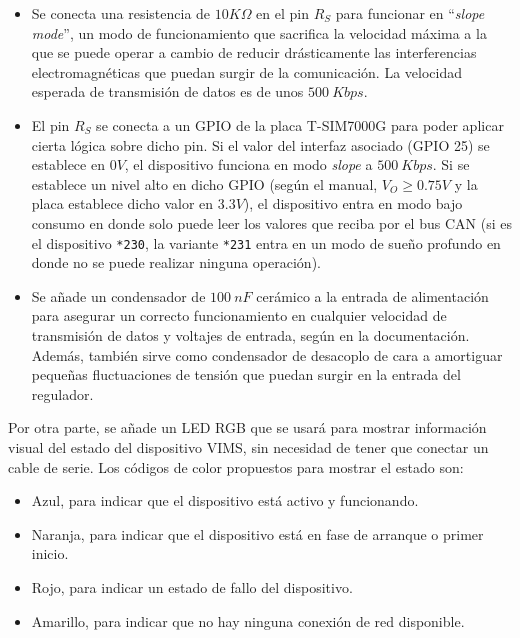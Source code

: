 \begin{itemize}
  \item Se conecta una resistencia de $10K\Omega$ en el pin $R_S$ para funcionar en
        ``\textit{slope mode}'', un modo de funcionamiento que sacrifica la velocidad
        máxima a la que se puede operar a cambio de reducir drásticamente las
        interferencias electromagnéticas que puedan surgir de la comunicación. La
        velocidad esperada de transmisión de datos es de unos $500~Kbps$.
  \item El pin $R_S$ se conecta a un \ac{GPIO} de la placa T-SIM7000G para poder
        aplicar cierta lógica sobre dicho pin. Si el valor del interfaz asociado
        (\ac{GPIO} 25) se establece en $0V$, el dispositivo funciona en modo \textit{slope}
        a $500~Kbps$. Si se establece un nivel alto en dicho \ac{GPIO} (según el manual,
        $V_O \ge 0.75V$ y la placa establece dicho valor en $3.3V$), el dispositivo
        entra en modo bajo consumo en donde solo puede leer los valores que reciba
        por el bus \ac{CAN} (si es el dispositivo \texttt{*230}, la variante
        \texttt{*231} entra en un modo de sueño profundo en donde no se puede realizar
        ninguna operación).
  \item Se añade un condensador de $100~nF$ cerámico a la entrada de alimentación
        para asegurar un correcto funcionamiento en cualquier velocidad de transmisión
        de datos y voltajes de entrada, según en la documentación. Además, también
        sirve como condensador de desacoplo de cara a amortiguar pequeñas fluctuaciones
        de tensión que puedan surgir en la entrada del regulador.
\end{itemize}

Por otra parte, se añade un LED RGB que se usará para mostrar información visual
del estado del dispositivo \ac{VIMS}, sin necesidad de tener que conectar un cable
de serie. Los códigos de color propuestos para mostrar el estado son:

\begin{itemize}
  \item Azul, para indicar que el dispositivo está activo y funcionando.
  \item Naranja, para indicar que el dispositivo está en fase de arranque o primer inicio.
  \item Rojo, para indicar un estado de fallo del dispositivo.
  \item Amarillo, para indicar que no hay ninguna conexión de red disponible.
\end{itemize}


